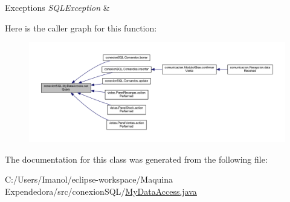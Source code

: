 \begin{DoxyExceptions}{Exceptions}
{\em S\+Q\+L\+Exception} & \\
\hline
\end{DoxyExceptions}
Here is the caller graph for this function\+:
\nopagebreak
\begin{figure}[H]
\begin{center}
\leavevmode
\includegraphics[width=350pt]{classconexion_s_q_l_1_1_my_data_access_a9c57d53829ea15bb0bc59d7647cc6249_icgraph}
\end{center}
\end{figure}


The documentation for this class was generated from the following file\+:\begin{DoxyCompactItemize}
\item 
C\+:/\+Users/\+Imanol/eclipse-\/workspace/\+Maquina Expendedora/src/conexion\+S\+Q\+L/\mbox{\hyperlink{_my_data_access_8java}{My\+Data\+Access.\+java}}\end{DoxyCompactItemize}
